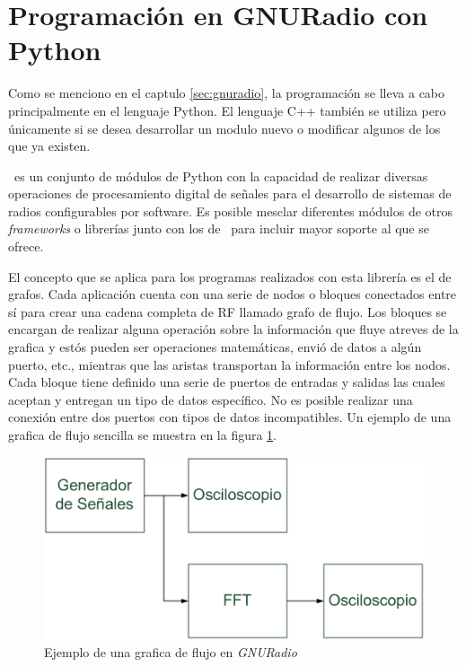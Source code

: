 \section{Programaci\'on en GNURadio con Python}

Como se menciono en el captulo \ref{sec:gnuradio}, la programaci\'on se lleva a
cabo principalmente en el lenguaje Python. El lenguaje C++ tambi\'en se utiliza
pero \'unicamente si se desea desarrollar un modulo nuevo o modificar algunos de
los que ya existen.

\gnuradio\ es un conjunto de m\'odulos de Python con la capacidad de
realizar diversas operaciones de procesamiento digital de se\~nales para el desarrollo de
sistemas de radios configurables por software. Es posible mesclar diferentes
m\'odulos de otros \emph{frameworks} o librer\'ias junto con los de \gnuradio\
para incluir mayor soporte al que se ofrece.

El concepto que se aplica para los programas realizados con esta librer\'ia es
el de grafos. Cada aplicaci\'on cuenta con una serie de nodos o bloques
conectados entre s\'i para crear una cadena completa de RF llamado grafo de
flujo. Los bloques se encargan de realizar alguna operaci\'on sobre la
informaci\'on que fluye atreves de la grafica y est\'os pueden ser operaciones
matem\'aticas, envi\'o de datos a alg\'un puerto, etc., mientras que las aristas
transportan la informaci\'on entre los nodos. Cada bloque tiene definido una
serie de puertos de entradas y salidas las cuales aceptan y entregan un tipo de
datos espec\'ifico. No es posible realizar una conexi\'on entre dos puertos con
tipos de datos incompatibles. Un ejemplo de una grafica de flujo sencilla se
muestra en la figura \ref{fig:radioflow}.

\begin{figure}[hpt]
\centering
	\includegraphics{figs/gnuradioflow}
	\caption{Ejemplo de una grafica de flujo en \emph{GNURadio}}
	\label{fig:radioflow}
\end{figure}


